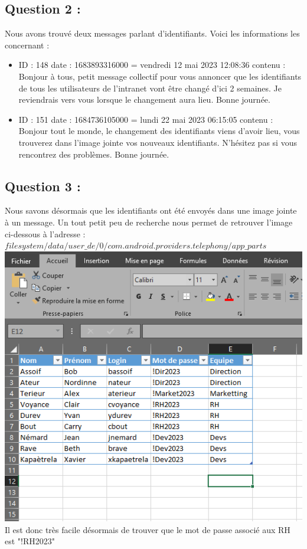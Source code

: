 \documentclass{article}
\begin{document}
    \subsection{Question 2 :}
        Nous avons trouvé deux messages parlant d'identifiants. Voici les informations les concernant : 
        \begin{itemize}
            \item ID : 148\newline
             date : 1683893316000 = vendredi 12 mai 2023 12:08:36\newline
             contenu : Bonjour à tous, petit message collectif pour vous annoncer que les identifiants de tous les utilisateurs de l’intranet vont être changé d’ici 2 semaines. Je reviendrais vers vous lorsque le changement aura lieu. Bonne journée.
            \item ID : 151\newline
             date : 1684736105000 = lundi 22 mai 2023 06:15:05\newline
             contenu : Bonjour tout le monde, le changement des identifiants viens d’avoir lieu, vous trouverez dans l’image jointe vos nouveaux identifiants. N’hésitez pas si vous rencontrez des problèmes. Bonne journée.
        \end{itemize}
    \subsection{Question 3 :}
        Nous savons désormais que les identifiants ont été envoyés dans une image jointe à un message. 
        Un tout petit peu de recherche nous permet de retrouver l'image ci-dessous à l'adresse :\newline
        $filesystem/data/user\_de/0/com.android.providers.telephony/app\_parts$\newline
        \includegraphics[scale=0.5]{id.jpg}\newline
        Il est donc très facile désormais de trouver que le mot de passe associé aux RH est "!RH2023"
\end{document}
